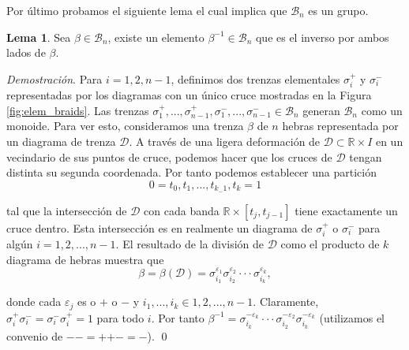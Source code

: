 \documentclass[12pt]{article}
\theoremstyle{definition}
\newtheorem{lema}{Lema}[section]
\begin{document}
Por último probamos el siguiente lema el cual implica que $\mathcal{B}_n$ es un grupo.

\begin{lema}
\label{lema:inverso}
Sea $\beta\in\mathcal{B}_n$, existe un elemento $\beta^{-1}\in\mathcal{B}_n$ que es el inverso por ambos lados de $\beta$.
\end{lema}
\textit{Demostración}. Para $i = 1,2,n-1$, definimos dos trenzas elementales $\sigma_i^+$ y $\sigma_i^-$ representadas por los diagramas con un único cruce mostradas en la Figura \ref{fig:elem_braids}. Las trenzas $\sigma_1^+,...,\sigma_{n-1}^+, \sigma_1^-,...,\sigma_{n-1}^-\in\mathcal{B}_n$ generan $\mathcal{B}_n$ como un monoide. Para ver esto, consideramos una trenza $\beta$ de $n$ hebras representada por un diagrama de trenza $\mathcal{D}$. A través de una ligera deformación de $\mathcal{D}\subset\mathbb{R}\times I$ en un vecindario de sus puntos de cruce, podemos hacer que los cruces de $\mathcal{D}$ tengan distinta su segunda coordenada. Por tanto podemos establecer una partición
$$0=t_0,t_1,...,t_{k_-1},t_k = 1$$

tal que la intersección de $\mathcal{D}$ con cada banda $\mathbb{R}\times[t_j, t_{j-1}]$ tiene exactamente un cruce dentro. Esta intersección es en realmente un diagrama de $\sigma_i^+$ o $\sigma_i^-$ para algún $i = 1,2,...,n-1$. El resultado de la división de $\mathcal{D}$ como el producto de $k$ diagrama de hebras muestra que
$$\beta = \beta(\mathcal{D}) = \sigma_{i_1}^{\varepsilon_1}\sigma_{i_2}^{\varepsilon_2}\cdot\cdot\cdot\sigma_{i_k}^{\varepsilon_k},$$

donde cada $\varepsilon_j$ es o $+$ o $-$ y $i_1,...,i_k\in{1,2,...,n-1}$.
Claramente, $\sigma_i^+\sigma_i^- = \sigma_i^-\sigma_i^+=1$ para todo $i$. Por tanto $\beta^{-1} = \sigma_{i_k}^{-\varepsilon_k}\cdot\cdot\cdot\sigma_{i_2}^{-\varepsilon_2}\sigma_{i_k}^{-\varepsilon_k}$ (utilizamos el convenio de $--=+$\newline$+-=-$). \qed
\end{document}
